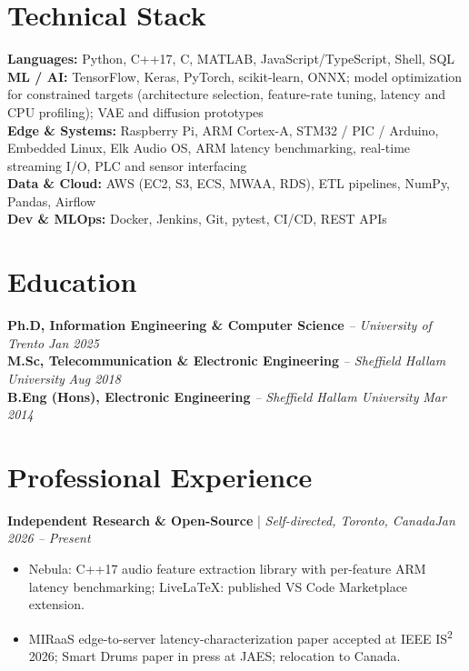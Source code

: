 \documentclass[11pt]{article}
\newenvironment{cvrole}[5]{%
  \par\noindent\textbf{\large #1} | \textit{\small #2, #3}\hfill \textit{\small #4 -- #5}\par
  \begin{itemize}[leftmargin=2em, itemsep=-0.3em, topsep=-0.5em]%
}{%
  \end{itemize}\par\noindent\mbox{}\par\vspace{0.1em}%
}
\begin{document}
\section*{Technical Stack}

\textbf{Languages:} Python, C++17, C, MATLAB, JavaScript/TypeScript, Shell, SQL\\
\textbf{ML / AI:} TensorFlow, Keras, PyTorch, scikit-learn, ONNX; model optimization for constrained targets (architecture selection, feature-rate tuning, latency and CPU profiling); VAE and diffusion prototypes\\
\textbf{Edge \& Systems:} Raspberry Pi, ARM Cortex-A, STM32 / PIC / Arduino, Embedded Linux, Elk Audio OS, ARM latency benchmarking, real-time streaming I/O, PLC and sensor interfacing\\
\textbf{Data \& Cloud:} AWS (EC2, S3, ECS, MWAA, RDS), ETL pipelines, NumPy, Pandas, Airflow\\
\textbf{Dev \& MLOps:} Docker, Jenkins, Git, pytest, CI/CD, REST APIs

\section*{Education}
\textbf{Ph.D, Information Engineering \& Computer Science} \textit{\small{-- University of Trento}} \hfill \textit{Jan 2025}\\[2pt]
\noindent\textbf{M.Sc, Telecommunication \& Electronic Engineering} \textit{\small{-- Sheffield Hallam University}} \hfill \textit{Aug 2018}\\[2pt]
\noindent\textbf{B.Eng (Hons), Electronic Engineering} \textit{\small{-- Sheffield Hallam University}} \hfill \textit{Mar 2014}

\section*{Professional Experience}

\begin{cvrole}{Independent Research \& Open-Source}{Self-directed}{Toronto, Canada}{Jan 2026}{Present}
    \item Nebula: C++17 audio feature extraction library with per-feature ARM latency benchmarking; LiveLaTeX: published VS Code Marketplace extension.
    \item MIRaaS edge-to-server latency-characterization paper accepted at IEEE IS\textsuperscript{2} 2026; Smart Drums paper in press at JAES; relocation to Canada.
\end{cvrole}
\end{document}
